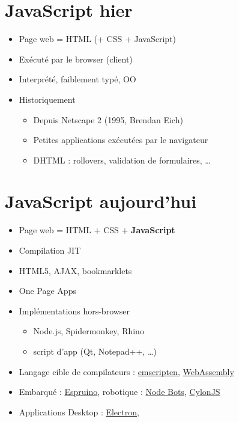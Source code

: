 \hypertarget{javascript-hier}{%
\section{JavaScript hier}\label{javascript-hier}}

\begin{itemize}
\tightlist
\item
  Page web = HTML (+ CSS + JavaScript)
\item
  Exécuté par le browser (client)
\item
  Interprété, faiblement typé, OO
\item
  Historiquement

  \begin{itemize}
  \tightlist
  \item
    Depuis Netscape 2 (1995, Brendan Eich)
  \item
    Petites applications exécutées par le navigateur
  \item
    DHTML : rollovers, validation de formulaires, \ldots{}
  \end{itemize}
\end{itemize}

\hypertarget{javascript-aujourdhui}{%
\section{JavaScript aujourd'hui}\label{javascript-aujourdhui}}

\begin{itemize}
\tightlist
\item
  Page web = HTML + CSS + \textbf{JavaScript}
\item
  Compilation JIT
\item
  HTML5, AJAX, bookmarklets
\item
  One Page Apps
\item
  Implémentations hors-browser

  \begin{itemize}
  \tightlist
  \item
    Node.js, Spidermonkey, Rhino
  \item
    script d'app (Qt, Notepad++, \ldots)
  \end{itemize}
\item
  Langage cible de compilateurs :
  \href{https://github.com/kripken/emscripten/wiki}{emscripten},
  \href{http://webassembly.org/}{WebAssembly}
\item
  Embarqué : \href{http://www.espruino.com/}{Espruino}, robotique :
  \href{https://nodebots.io/}{Node Bots},
  \href{https://cylonjs.com/}{CylonJS}
\item
  Applications Desktop : \href{https://electronjs.org/}{Electron},
  \href{https://sciter.com/}{}
\end{itemize}

